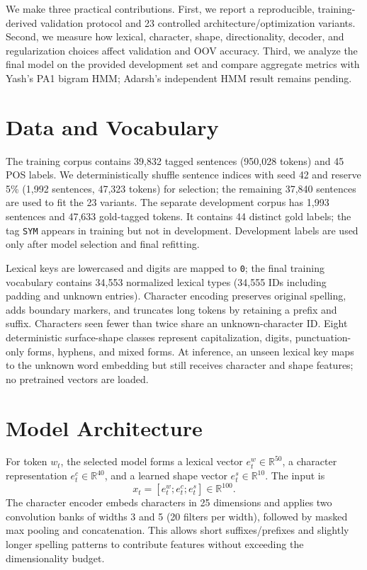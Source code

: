 \documentclass[11pt]{article}
\begin{document}
We make three practical contributions. First, we report a reproducible, training-derived validation protocol and 23 controlled architecture/optimization variants. Second, we measure how lexical, character, shape, directionality, decoder, and regularization choices affect validation and OOV accuracy. Third, we analyze the final model on the provided development set and compare aggregate metrics with Yash's PA1 bigram HMM; Adarsh's independent HMM result remains pending.

\section{Data and Vocabulary}
The training corpus contains 39,832 tagged sentences (950,028 tokens) and 45 POS labels. We deterministically shuffle sentence indices with seed 42 and reserve 5\% (1,992 sentences, 47,323 tokens) for selection; the remaining 37,840 sentences are used to fit the 23 variants. The separate development corpus has 1,993 sentences and 47,633 gold-tagged tokens. It contains 44 distinct gold labels; the tag \texttt{SYM} appears in training but not in development. Development labels are used only after model selection and final refitting.

Lexical keys are lowercased and digits are mapped to \texttt{0}; the final training vocabulary contains 34,553 normalized lexical types (34,555 IDs including padding and unknown entries). Character encoding preserves original spelling, adds boundary markers, and truncates long tokens by retaining a prefix and suffix. Characters seen fewer than twice share an unknown-character ID. Eight deterministic surface-shape classes represent capitalization, digits, punctuation-only forms, hyphens, and mixed forms. At inference, an unseen lexical key maps to the unknown word embedding but still receives character and shape features; no pretrained vectors are loaded.

\section{Model Architecture}
For token $w_t$, the selected model forms a lexical vector $e_t^w\in\mathbb{R}^{50}$, a character representation $e_t^c\in\mathbb{R}^{40}$, and a learned shape vector $e_t^s\in\mathbb{R}^{10}$. The input is
\begin{equation}
 x_t=[e_t^w;e_t^c;e_t^s]\in\mathbb{R}^{100}.
\end{equation}
The character encoder embeds characters in 25 dimensions and applies two convolution banks of widths 3 and 5 (20 filters per width), followed by masked max pooling and concatenation. This allows short suffixes/prefixes and slightly longer spelling patterns to contribute features without exceeding the dimensionality budget.
\end{document}
